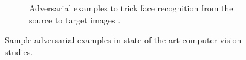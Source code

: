 \begin{figure}[p]
\begin{subfigure}[b]{0.8\linewidth}
    \caption{Adversarial examples to trick face recognition from the source to target images \citep{Wang:2018vl}.}
  \end{subfigure}

  \caption[Adversarial examples in computer vision]{Sample adversarial examples in state-of-the-art computer vision studies.}
  \label{fig:background:software-quality:reliability-in-cv:adversarial-examples}
\end{figure}